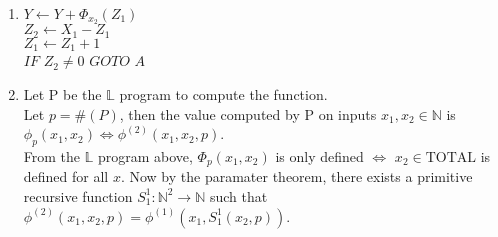\documentclass{assignment}
\begin{document}
\begin{problemlist}
  \pbitem
  \begin{problem}
  \end{problem}
  \begin{answer}
    \\
    \begin{enumerate}
    \item
      $Y \leftarrow Y + \Phi_{x_2}(Z_1)$\\
      $Z_2\leftarrow X_1-Z_1$\\
      $Z_1 \leftarrow Z_1 + 1$\\
      $IF$ $Z_2\neq 0$ $GOTO$ $A$\\
    \item
      Let P be the $\mathbb{L}$ program to compute the function.\\
      Let $p= \#(P)$, then the value computed by P on inputs $x_1,x_2\in \mathbb{N}$ is $\phi_{p}(x_{1},x_{2}) \Leftrightarrow \phi^{(2)}(x_{1},x_2,p)$.\\
      \smallskip
      From the $\mathbb{L}$ program above, $\Phi_{p}(x_{1},x_{2})$ is only defined $\Leftrightarrow$ $x_{2} \in \text{TOTAL}$ is defined for all $x$. Now by the paramater theorem, there exists a primitive recursive function $S_1^1:\mathbb{N}^2\rightarrow\mathbb{N}$ such that $\phi^{(2)}(x_{1},x_2,p)=\phi^{(1)}(x_{1},S_1^1(x_2,p))$.\\

\end{enumerate}
\end{answer}
\end{problemlist}
\end{document}
